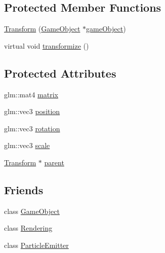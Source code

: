 \subsection*{Protected Member Functions}
\begin{DoxyCompactItemize}
\item 
\hyperlink{class_mason_1_1_transform_a00209266b27fa0c297551a0ce4a07017}{Transform} (\hyperlink{class_mason_1_1_game_object}{Game\+Object} $\ast$\hyperlink{class_mason_1_1_component_a30030370c35f5562cbbbb0927b0448c8}{game\+Object})
\item 
virtual void \hyperlink{class_mason_1_1_transform_a4dd61568d49044377f3312397ffdafd1}{transformize} ()
\end{DoxyCompactItemize}
\subsection*{Protected Attributes}
\begin{DoxyCompactItemize}
\item 
glm\+::mat4 \hyperlink{class_mason_1_1_transform_aeb64a62787375e23645da6f490763c25}{matrix}
\item 
glm\+::vec3 \hyperlink{class_mason_1_1_transform_ac9e11b4ec4433a38ac1100f12c955dcb}{position}
\item 
glm\+::vec3 \hyperlink{class_mason_1_1_transform_ae2f541ade79d561584619e93edb034ae}{rotation}
\item 
glm\+::vec3 \hyperlink{class_mason_1_1_transform_a4618b31e34a6ec8a0ee638401fc56367}{scale}
\item 
\hyperlink{class_mason_1_1_transform}{Transform} $\ast$ \hyperlink{class_mason_1_1_transform_a1e2c91adcef43bcc170803656260f9db}{parent}
\end{DoxyCompactItemize}
\subsection*{Friends}
\begin{DoxyCompactItemize}
\item 
class \hyperlink{class_mason_1_1_transform_a00df87c957d8f7ee0fc51f07a0542f4a}{Game\+Object}
\item 
class \hyperlink{class_mason_1_1_transform_a33061a25b8332281d02c83e2bf1d4959}{Rendering}
\item 
class \hyperlink{class_mason_1_1_transform_a82b374d797a09668286ac5cf26f539f3}{Particle\+Emitter}
\end{DoxyCompactItemize}


